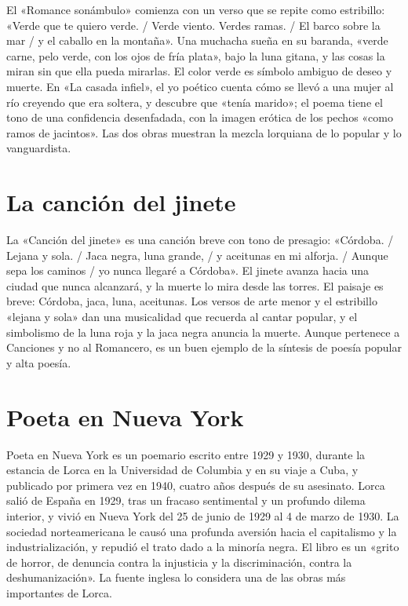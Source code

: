 \documentclass{book}
\begin{document}
El «Romance sonámbulo» comienza con un verso que se repite como estribillo: «Verde que te quiero verde. / Verde viento. Verdes ramas. / El barco sobre la mar / y el caballo en la montaña». Una muchacha sueña en su baranda, «verde carne, pelo verde, con los ojos de fría plata», bajo la luna gitana, y las cosas la miran sin que ella pueda mirarlas. El color verde es símbolo ambiguo de deseo y muerte. En «La casada infiel», el yo poético cuenta cómo se llevó a una mujer al río creyendo que era soltera, y descubre que «tenía marido»; el poema tiene el tono de una confidencia desenfadada, con la imagen erótica de los pechos «como ramos de jacintos». Las dos obras muestran la mezcla lorquiana de lo popular y lo vanguardista.


\section{La canción del jinete}

La «Canción del jinete» es una canción breve con tono de presagio: «Córdoba. / Lejana y sola. / Jaca negra, luna grande, / y aceitunas en mi alforja. / Aunque sepa los caminos / yo nunca llegaré a Córdoba». El jinete avanza hacia una ciudad que nunca alcanzará, y la muerte lo mira desde las torres. El paisaje es breve: Córdoba, jaca, luna, aceitunas. Los versos de arte menor y el estribillo «lejana y sola» dan una musicalidad que recuerda al cantar popular, y el simbolismo de la luna roja y la jaca negra anuncia la muerte. Aunque pertenece a Canciones y no al Romancero, es un buen ejemplo de la síntesis de poesía popular y alta poesía.


\section{Poeta en Nueva York}

Poeta en Nueva York es un poemario escrito entre 1929 y 1930, durante la estancia de Lorca en la Universidad de Columbia y en su viaje a Cuba, y publicado por primera vez en 1940, cuatro años después de su asesinato. Lorca salió de España en 1929, tras un fracaso sentimental y un profundo dilema interior, y vivió en Nueva York del 25 de junio de 1929 al 4 de marzo de 1930. La sociedad norteamericana le causó una profunda aversión hacia el capitalismo y la industrialización, y repudió el trato dado a la minoría negra. El libro es un «grito de horror, de denuncia contra la injusticia y la discriminación, contra la deshumanización». La fuente inglesa lo considera una de las obras más importantes de Lorca.
\end{document}
